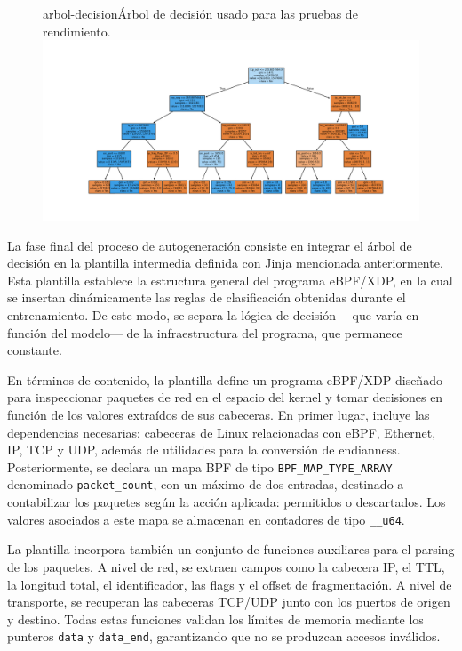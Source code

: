 \begin{figure}[Árbol de Decisión]{arbol-decision}{Árbol de decisión usado para las pruebas de rendimiento.}
	\includegraphics[width=1\textwidth]{capturas/arbolrw2.png}
\end{figure}


La fase final del proceso de autogeneración consiste en integrar el árbol de decisión en la plantilla intermedia definida con Jinja mencionada anteriormente. Esta plantilla establece la estructura general del programa eBPF/XDP, en la cual se insertan dinámicamente las reglas de clasificación obtenidas durante el entrenamiento. De este modo, se separa la lógica de decisión —que varía en función del modelo— de la infraestructura del programa, que permanece constante.

En términos de contenido, la plantilla define un programa eBPF/XDP diseñado para inspeccionar paquetes de red en el espacio del kernel y tomar decisiones en función de los valores extraídos de sus cabeceras. En primer lugar, incluye las dependencias necesarias: cabeceras de Linux relacionadas con eBPF, Ethernet, IP, TCP y UDP, además de utilidades para la conversión de endianness. Posteriormente, se declara un mapa BPF de tipo \verb|BPF_MAP_TYPE_ARRAY| denominado \verb|packet_count|, con un máximo de dos entradas, destinado a contabilizar los paquetes según la acción aplicada: permitidos o descartados. Los valores asociados a este mapa se almacenan en contadores de tipo \verb|__u64|.

La plantilla incorpora también un conjunto de funciones auxiliares para el parsing de los paquetes. A nivel de red, se extraen campos como la cabecera IP, el TTL, la longitud total, el identificador, las flags y el offset de fragmentación. A nivel de transporte, se recuperan las cabeceras TCP/UDP junto con los puertos de origen y destino. Todas estas funciones validan los límites de memoria mediante los punteros \verb|data| y \verb|data_end|, garantizando que no se produzcan accesos inválidos.


